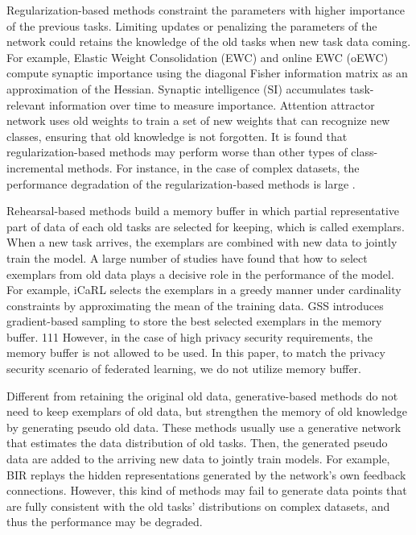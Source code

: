 \documentclass[sigconf,anonymous,review,screen]{acmart}
\begin{document}
Regularization-based methods \cite{aljundi2018memory,kirkpatrick2017overcoming,li2017learning,zenke2017continual} constraint the parameters with higher importance of the previous tasks. Limiting updates or penalizing the parameters of the network could retains the knowledge of the old tasks when new task data coming. For example, Elastic Weight Consolidation (EWC) \cite{kirkpatrick2017overcoming} and online EWC (oEWC) \cite{schwarz2018progress} compute synaptic importance using the diagonal Fisher information matrix as an approximation of the Hessian. Synaptic intelligence (SI) \cite{zenke2017continual} accumulates task-relevant information over time to measure importance. Attention attractor network \cite{ren2019incremental} uses old weights to train a set of new weights that can recognize new classes, ensuring that old knowledge is not forgotten. It is found that regularization-based methods may perform worse than other types of class-incremental methods. For instance, in the case of complex datasets, the performance degradation of the regularization-based methods is large \cite{wu2019large}.

Rehearsal-based methods \cite{rebuffi2017icarl,aljundi2019gradient} build a memory buffer in which partial representative part of data of each old tasks are selected for keeping, which is called exemplars. When a new task arrives, the exemplars are combined with new data to jointly train the model. %
A large number of studies have found that how to select exemplars from old data plays a decisive role in the performance of the model. For example, iCaRL \cite{rebuffi2017icarl} selects the exemplars in a greedy manner under cardinality constraints by approximating the mean of the training data. GSS \cite{aljundi2019gradient} introduces gradient-based sampling to store the best selected exemplars in the memory buffer. 111 However, in the case of high privacy security requirements, the memory buffer is not allowed to be used. In this paper, to match the privacy security scenario of federated learning, we do not utilize memory buffer.

Different from retaining the original old data, generative-based methods \cite{van2020brain,agarwal2022semantics} do not need to keep exemplars of old data, but strengthen the memory of old knowledge by generating pseudo old data. These methods usually use a generative network that estimates the data distribution of old tasks. Then, the generated pseudo data are added to the arriving new data to jointly train models. For example, BIR \cite{van2020brain} replays the hidden representations generated by the network's own feedback connections. However, this kind of methods may fail to generate data points that are fully consistent with the old tasks' distributions on complex datasets, and thus the performance may be degraded.
\end{document}
